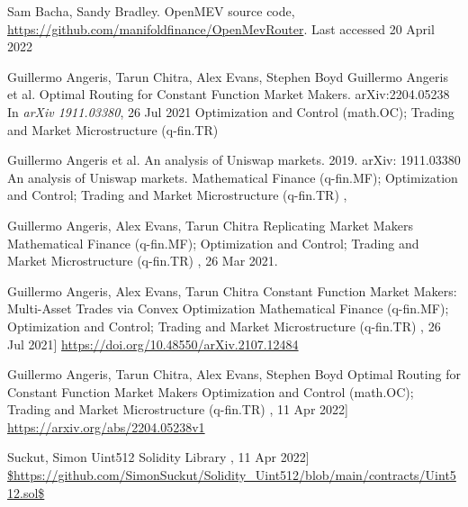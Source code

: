 \documentclass[runningheads]{llncs}
\begin{document}
\begin{thebibliography}{1}
	Sam Bacha, Sandy Bradley.
	OpenMEV source code, \url{https://github.com/manifoldfinance/OpenMevRouter}.
	Last accessed 20 April 2022
	
	\newline
	Guillermo Angeris, Tarun Chitra, Alex Evans, Stephen Boyd
	\newblock Guillermo Angeris et al. Optimal Routing for Constant Function Market Makers.	arXiv:2204.05238
	\newblock In {\em arXiv 1911.03380}, 26 Jul 2021
	Optimization and Control (math.OC); Trading and Market Microstructure (q-fin.TR)

	\hfill \break
	Guillermo Angeris et al. An analysis of Uniswap markets. 2019. arXiv: 1911.03380
	\newblock An analysis of Uniswap markets.
	Mathematical Finance (q-fin.MF); Optimization and Control; Trading and Market Microstructure (q-fin.TR)
	,

	\hfill \break
	Guillermo Angeris, Alex Evans, Tarun Chitra
	\newblock Replicating Market Makers
	Mathematical Finance (q-fin.MF); Optimization and Control; Trading and Market Microstructure (q-fin.TR)
	, 26 Mar 2021.

	\hfill \break
	Guillermo Angeris, Alex Evans, Tarun Chitra
	\newblock Constant Function Market Makers: Multi-Asset Trades via Convex Optimization
	Mathematical Finance (q-fin.MF); Optimization and Control; Trading and Market Microstructure (q-fin.TR)
	, 26 Jul 2021]
	\url{https://doi.org/10.48550/arXiv.2107.12484}

	\hfill \break
	Guillermo Angeris, Tarun Chitra, Alex Evans, Stephen Boyd
	\newblock Optimal Routing for Constant Function Market Makers
	Optimization and Control (math.OC); Trading and Market Microstructure (q-fin.TR)
	, 11 Apr 2022]
	\url{https://arxiv.org/abs/2204.05238v1}

	\hfill \break
	Suckut, Simon
	\newblock Uint512 Solidity Library
	, 11 Apr 2022]
	\url{$https://github.com/SimonSuckut/Solidity_Uint512/blob/main/contracts/Uint512.sol$}



\end{thebibliography}
\end{document}
